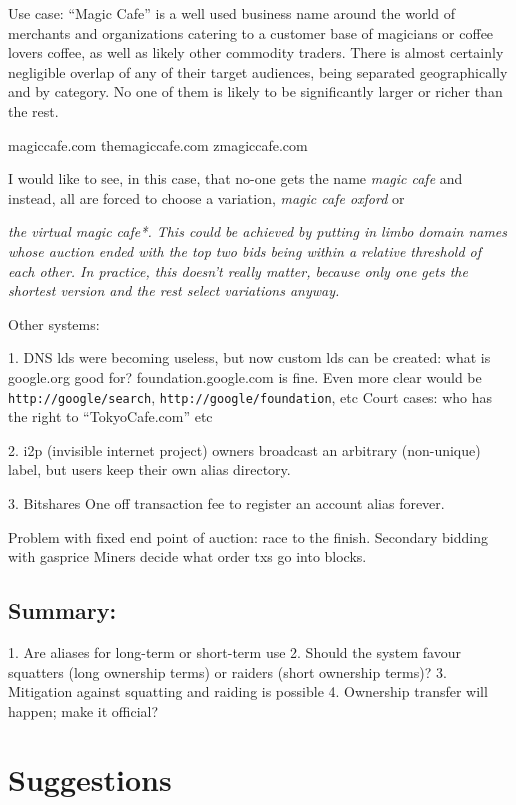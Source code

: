 \documentclass[10pt,a4paper]{article}
\begin{document}
Use case: ``Magic Cafe'' is a well used business name around the world of merchants and organizations catering to a customer base of magicians or coffee lovers coffee, as well as likely other commodity traders. There is almost certainly negligible overlap of any of their target audiences, being separated geographically and by category. No one of them is likely to be significantly larger or richer than the rest.

magiccafe.com
themagiccafe.com
zmagiccafe.com

I would like to see, in this case, that no-one gets the name {\it magic cafe} and instead, all are forced to choose a variation, {\it magic cafe oxford} or {\it the virtual magic cafe*. This could be achieved by putting in limbo domain names whose auction ended with the top two bids being within a relative threshold of each other. In practice, this doesn't really matter, because only one gets the shortest version and the rest select variations anyway.


Other systems:

1. DNS
	lds were becoming useless, but now custom 	lds can be created: what is google.org good for? foundation.google.com is fine. Even more clear would be {\tt http://google/search}, {\tt http://google/foundation}, etc
Court cases: who has the right to ``TokyoCafe.com'' etc

2. i2p (invisible internet project)
owners broadcast an arbitrary (non-unique) label, but users keep their own alias directory.

3. Bitshares
One off transaction fee to register an account alias forever.


Problem with fixed end point of auction: race to the finish.
Secondary bidding with gasprice
Miners decide what order txs go into blocks.





\subsection*{Summary:}

1. Are aliases for long-term or short-term use
2. Should the system favour squatters (long ownership terms) or raiders (short ownership terms)?
3. Mitigation against squatting and raiding is possible
4. Ownership transfer will happen; make it official?


\section*{Suggestions}

}
\end{document}
